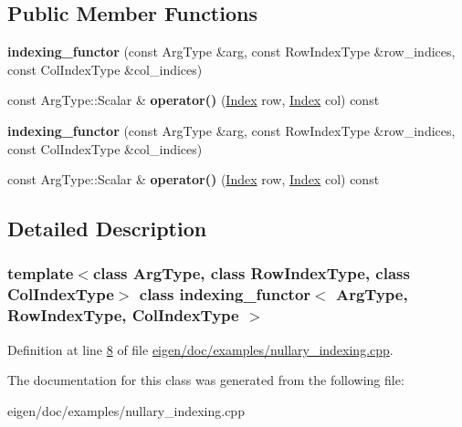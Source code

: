 \subsection*{Public Member Functions}
\begin{DoxyCompactItemize}
\item 
\mbox{\label{classindexing__functor_a3ed1657eebe56f3f0942d07edc7c8416}} 
{\bfseries indexing\+\_\+functor} (const Arg\+Type \&arg, const Row\+Index\+Type \&row\+\_\+indices, const Col\+Index\+Type \&col\+\_\+indices)
\item 
\mbox{\label{classindexing__functor_a53438e5be137a168965f6d2046d1196b}} 
const Arg\+Type\+::\+Scalar \& {\bfseries operator()} (\hyperlink{namespace_eigen_a62e77e0933482dafde8fe197d9a2cfde}{Index} row, \hyperlink{namespace_eigen_a62e77e0933482dafde8fe197d9a2cfde}{Index} col) const
\item 
\mbox{\label{classindexing__functor_a3ed1657eebe56f3f0942d07edc7c8416}} 
{\bfseries indexing\+\_\+functor} (const Arg\+Type \&arg, const Row\+Index\+Type \&row\+\_\+indices, const Col\+Index\+Type \&col\+\_\+indices)
\item 
\mbox{\label{classindexing__functor_a53438e5be137a168965f6d2046d1196b}} 
const Arg\+Type\+::\+Scalar \& {\bfseries operator()} (\hyperlink{namespace_eigen_a62e77e0933482dafde8fe197d9a2cfde}{Index} row, \hyperlink{namespace_eigen_a62e77e0933482dafde8fe197d9a2cfde}{Index} col) const
\end{DoxyCompactItemize}


\subsection{Detailed Description}
\subsubsection*{template$<$class Arg\+Type, class Row\+Index\+Type, class Col\+Index\+Type$>$\newline
class indexing\+\_\+functor$<$ Arg\+Type, Row\+Index\+Type, Col\+Index\+Type $>$}



Definition at line \hyperlink{eigen_2doc_2examples_2nullary__indexing_8cpp_source_l00008}{8} of file \hyperlink{eigen_2doc_2examples_2nullary__indexing_8cpp_source}{eigen/doc/examples/nullary\+\_\+indexing.\+cpp}.



The documentation for this class was generated from the following file\+:\begin{DoxyCompactItemize}
\item 
eigen/doc/examples/nullary\+\_\+indexing.\+cpp\end{DoxyCompactItemize}
